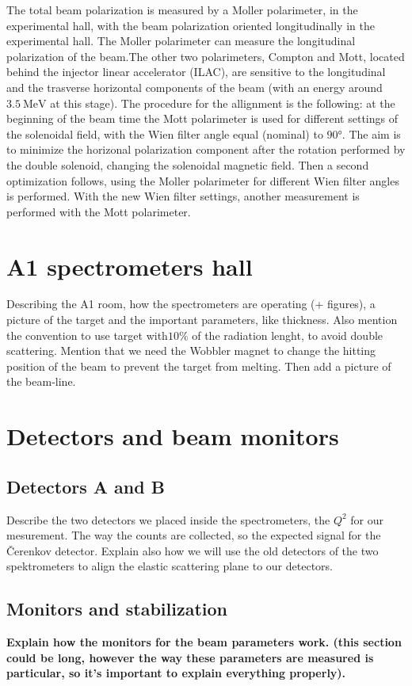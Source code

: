 The total beam polarization is measured by a Moller polarimeter, in the experimental hall, with the beam polarization oriented longitudinally in the experimental hall. The Moller polarimeter can measure the longitudinal polarization of the beam.The other two polarimeters, Compton and Mott, located behind the injector linear accelerator (ILAC), are sensitive to the longitudinal and the trasverse horizontal components of the beam (with an energy around $\SI{3.5}{\mega \electronvolt}$ at this stage). The procedure for the allignment is the following: at the beginning of the beam time the Mott polarimeter is used for different settings of the solenoidal field, with the Wien filter angle equal (nominal) to $\ang{90}$. The aim is to minimize the horizonal polarization component after the rotation performed by the double solenoid, changing the solenoidal magnetic field. Then a second optimization follows, using the Moller polarimeter for different Wien filter angles is performed. With the new Wien filter settings, another measurement is performed with the Mott polarimeter.


\section{A1 spectrometers hall}

Describing the A1 room, how the spectrometers are operating (+ figures), a picture of the target and the important parameters, like thickness. Also mention the convention to use target with$10 \%$ of the radiation lenght, to avoid double scattering.  Mention that we need the Wobbler magnet to change the hitting position of the beam to prevent the target from melting.
Then add a picture of the beam-line.

\section{Detectors and beam monitors}

\subsection{Detectors A and B}
Describe the two detectors we placed inside the spectrometers, the $Q^{2}$ for our mesurement. The way the counts are collected, so the expected signal for the Čerenkov detector. Explain also how we will use the old detectors of the two spektrometers to align the elastic scattering plane to our detectors.

\subsection{Monitors and stabilization}
{\bfseries Explain how the monitors for the beam parameters work. (this section could be long, however the way these parameters are measured is particular, so it's important to explain everything properly).}

